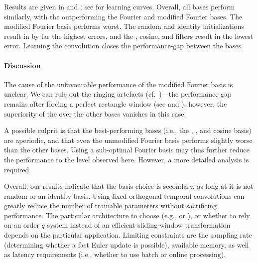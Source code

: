 Results are given in  and ; see  for learning curves.
Overall, all bases perform similarly, with the \LDN outperforming the Fourier and modified Fourier bases.
The modified Fourier basis performs worst.
The random and identity initializations result in by far the highest errors, and the \LDN, cosine, and \DLOP filters result in the lowest error.
Learning the convolution closes the performance-gap between the bases.

\paragraph{Discussion}
The cause of the unfavourable performance of the modified Fourier basis is unclear.
We can rule out the ringing artefacts (cf.~)---the performance gap remains after forcing a perfect rectangle window (see  and ); however, the superiority of the \LDN over the other bases vanishes in this case.

A possible culprit is that the best-performing bases (i.e., the \LDN, \DLOP, and cosine basis) are aperiodic, and that even the unmodified Fourier basis performs slightly worse than the other bases.
Using a sub-optimal Fourier basis may thus further reduce the performance to the level observed here.
However, a more detailed analysis is required.

Overall, our results indicate that the basis choice is secondary, as long at it is not random or an identity basis.
Using fixed orthogonal temporal convolutions can greatly reduce the number of trainable parameters without sacrificing performance.
The particular architecture to choose (e.g., \FIR or \LRGF \LMU), or whether to rely on an order $q$ \LTI system instead of an efficient sliding-window transformation depends on the particular application.
Limiting constraints are the sampling rate (determining whether a fast Euler update is possible), available memory, as well as latency requirements (i.e., whether to use batch or online processing).